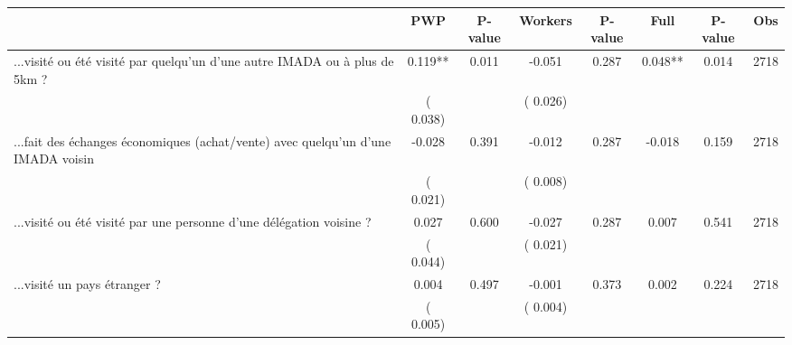 
\begin{tabular}{l*{7}{c}}\hline&\multicolumn{1}{c}{PWP}&\multicolumn{1}{c}{P-value}&\multicolumn{1}{c}{Workers}&\multicolumn{1}{c}{P-value}&\multicolumn{1}{c}{Full}&\multicolumn{1}{c}{P-value}&\multicolumn{1}{c}{Obs} \\ \hline

 ...visité ou été visité par quelqu'un d'une autre IMADA ou à plus de 5km ?       &              0.119**       &        0.011  &             -0.051       &        0.287  &              0.048**       &              0.014 &  2718 \\ 
                       &       (       0.038)             &                               &       (       0.026)                     &                               &                                               &                                &                      \\ 

 ...fait des échanges économiques (achat/vente) avec quelqu'un d'une IMADA voisin       &             -0.028       &        0.391  &             -0.012       &        0.287  &             -0.018       &              0.159 &  2718 \\ 
                       &       (       0.021)             &                               &       (       0.008)                     &                               &                                               &                                &                      \\ 

 ...visité ou été visité par une personne d'une délégation voisine ?       &              0.027       &        0.600  &             -0.027       &        0.287  &              0.007       &              0.541 &  2718 \\ 
                       &       (       0.044)             &                               &       (       0.021)                     &                               &                                               &                                &                      \\ 

 ...visité un pays étranger ?       &              0.004       &        0.497  &             -0.001       &        0.373  &              0.002       &              0.224 &  2718 \\ 
                       &       (       0.005)             &                               &       (       0.004)                     &                               &                                               &                                &                      \\ 

\hline \end{tabular}